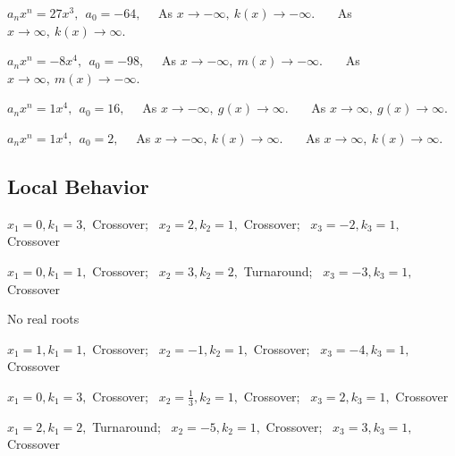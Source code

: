 \documentclass[12pt]{book}
\theoremstyle{definition}
\newcommand{\Desmos}{\href{https://www.desmos.com/}{Desmos}}
\begin{document}
\begin{oddenumerate}
$a_nx^n=27x^3, \ \ a_0=-64,$ \ \ As $x\rightarrow -\infty, \ k(x)\rightarrow -\infty$. \ \ \ As $x\rightarrow\infty, \ k(x)\rightarrow \infty$.
    \item %
$a_nx^n=-8x^4, \ \ a_0=-98,$ \ \ As $x\rightarrow -\infty, \ m(x)\rightarrow -\infty$. \ \ \ As $x\rightarrow\infty, \ m(x)\rightarrow -\infty$.
	\item %
$a_nx^n=1x^4, \ \ a_0=16,$ \ \ As $x\rightarrow -\infty, \ g(x)\rightarrow \infty$. \ \ \ As $x\rightarrow\infty, \ g(x)\rightarrow \infty$.
	\item %
$a_nx^n=1x^4, \ \ a_0=2,$ \ \ As $x\rightarrow -\infty, \ k(x)\rightarrow \infty$. \ \ \ As $x\rightarrow\infty, \ k(x)\rightarrow \infty$.
\end{oddenumerate}
\subsection*{Local Behavior}
\begin{oddenumerate}
\item %
$x_1=0, k_1=3,$ Crossover; \ $x_2=2, k_2=1,$ Crossover;  \ $x_3=-2, k_3=1,$ Crossover
\item %
$x_1=0, k_1=1,$ Crossover; \ $x_2=3, k_2=2,$ Turnaround;  \ $x_3=-3, k_3=1,$ Crossover
\item %
No real roots
\item %
$x_1=1, k_1=1,$ Crossover; \ $x_2=-1, k_2=1,$ Crossover;  \ $x_3=-4, k_3=1,$ Crossover
\item %
$x_1=0, k_1=3,$ Crossover; \ $x_2=\frac{1}{3}, k_2=1,$ Crossover;  \ $x_3=2, k_3=1,$ Crossover 
\item %
$x_1=2, k_1=2,$ Turnaround; \ $x_2=-5, k_2=1,$ Crossover;  \ $x_3=3, k_3=1,$ Crossover 
\end{oddenumerate}
\end{document}
